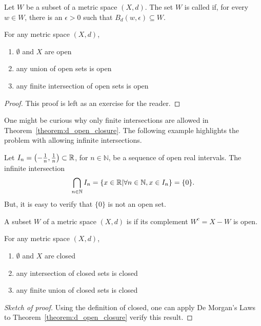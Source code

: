 \begin{definition}
\label{definition:metspace_dopen}
Let $W$ be a subset of a metric space $(X,d)$.
The set $W$ is called  if, for every $w\in W$, there is an $\epsilon>0$ such that $B_d (w,\epsilon) \subseteq W$.
\end{definition}

\begin{theorem}
\label{theorem:d_open_closure}
For any metric space $(X,d)$,
\begin{enumerate}
\item $\emptyset$ and $X$ are open
\item any union of open sets is open
\item any finite intersection of open sets is open
\end{enumerate}
\end{theorem}
\begin{proof}
This proof is left as an exercise for the reader.
\end{proof}

One might be curious why only finite intersections are allowed in Theorem~\ref{theorem:d_open_closure}.
The following example highlights the problem with allowing infinite intersections.
\begin{example}
Let $I_n = \left(-\frac{1}{n},\frac{1}{n} \right) \subset \mathbb{R}$, for $n\in \mathbb{N}$, be a sequence of open real intervals.
The infinite intersection
\[ \bigcap_{n\in \mathbb{N}} I_n = \{ x\in \mathbb{R} | \forall n\in \mathbb{N}, x\in I_n \} = \{0 \}. \]
But, it is easy to verify that $\{ 0 \}$ is not an open set.
\end{example}

\begin{definition}
A subset $W$ of a metric space $(X,d)$ is  if its complement $W^c = X-W$ is open.
\end{definition}

\begin{corollary}
For any metric space $(X,d)$,
\begin{enumerate}
\item $\emptyset$ and $X$ are closed
\item any intersection of closed sets is closed
\item any finite union of closed sets is closed
\end{enumerate}
\end{corollary}
\begin{proof}[Sketch of proof]
Using the definition of closed, one can apply De Morgan's Laws to Theorem~\ref{theorem:d_open_closure} verify this result.
\end{proof}

